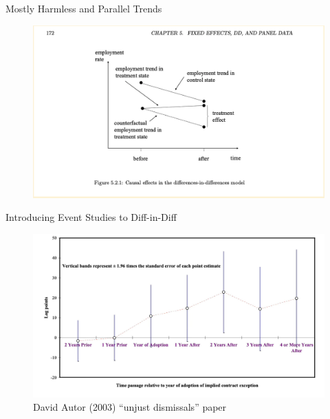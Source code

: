 \documentclass{beamer}
\begin{document}
\begin{frame}{Mostly Harmless and Parallel Trends}


	\begin{figure}
	\includegraphics[scale=0.45]{./lecture_includes/mhe_pt}
	\end{figure}



\end{frame}








\begin{frame}{Introducing Event Studies to Diff-in-Diff}

	\begin{figure}
	\includegraphics[scale=0.35]{./lecture_includes/autor2003}
	\caption{David Autor (2003) ``unjust dismissals'' paper}
	\end{figure}

\end{frame}
\end{document}
